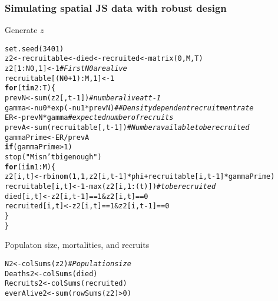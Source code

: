 \documentclass[color=usenames,dvipsnames]{beamer}\usepackage[]{graphicx}\usepackage[]{color}
\makeatletter
\newcommand{\hlnum}[1]{\textcolor[rgb]{0.69,0.494,0}{#1}}%
\newcommand{\hlstr}[1]{\textcolor[rgb]{0.749,0.012,0.012}{#1}}%
\newcommand{\hlcom}[1]{\textcolor[rgb]{0.514,0.506,0.514}{\textit{#1}}}%
\newcommand{\hlopt}[1]{\textcolor[rgb]{0,0,0}{#1}}%
\newcommand{\hlstd}[1]{\textcolor[rgb]{0,0,0}{#1}}%
\newcommand{\hlkwa}[1]{\textcolor[rgb]{0,0,0}{\textbf{#1}}}%
\newcommand{\hlkwb}[1]{\textcolor[rgb]{0,0.341,0.682}{#1}}%
\newcommand{\hlkwd}[1]{\textcolor[rgb]{0.004,0.004,0.506}{#1}}%
\newenvironment{kframe}{%
 \def\at@end@of@kframe{}%
 \ifinner\ifhmode%
  \def\at@end@of@kframe{\end{minipage}}%
  \begin{minipage}{\columnwidth}%
 \fi\fi%
 \def\FrameCommand##1{\hskip\@totalleftmargin \hskip-\fboxsep
 \colorbox{shadecolor}{##1}\hskip-\fboxsep
     \hskip-\linewidth \hskip-\@totalleftmargin \hskip\columnwidth}%
 \MakeFramed {\advance\hsize-\width
   \@totalleftmargin\z@ \linewidth\hsize
   \@setminipage}}%
 {\par\unskip\endMakeFramed%
 \at@end@of@kframe}
\newenvironment{knitrout}{}{} %
\makeatother
\begin{document}
\begin{frame}[fragile]
  \frametitle{Simulating spatial JS data with robust design}
{Generate $z$}
\scriptsize
\begin{knitrout}
\color{fgcolor}\begin{kframe}
\begin{alltt}
\hlkwd{set.seed}\hlstd{(}\hlnum{3401}\hlstd{)}
\hlstd{z2} \hlkwb{<-} \hlstd{recruitable} \hlkwb{<-} \hlstd{died} \hlkwb{<-} \hlstd{recruited} \hlkwb{<-} \hlkwd{matrix}\hlstd{(}\hlnum{0}\hlstd{, M, T)}
\hlstd{z2[}\hlnum{1}\hlopt{:}\hlstd{N0,}\hlnum{1}\hlstd{]} \hlkwb{<-} \hlnum{1} \hlcom{# First N0 are alive}
\hlstd{recruitable[(N0}\hlopt{+}\hlnum{1}\hlstd{)}\hlopt{:}\hlstd{M,}\hlnum{1}\hlstd{]} \hlkwb{<-} \hlnum{1}
\hlkwa{for}\hlstd{(t} \hlkwa{in} \hlnum{2}\hlopt{:}\hlstd{T) \{}
    \hlstd{prevN} \hlkwb{<-} \hlkwd{sum}\hlstd{(z2[,t}\hlopt{-}\hlnum{1}\hlstd{])} \hlcom{# number alive at t-1}
    \hlstd{gamma} \hlkwb{<-} \hlstd{nu0}\hlopt{*}\hlkwd{exp}\hlstd{(}\hlopt{-}\hlstd{nu1}\hlopt{*}\hlstd{prevN)} \hlcom{## Density dependent recruitment rate}
    \hlstd{ER} \hlkwb{<-} \hlstd{prevN}\hlopt{*}\hlstd{gamma} \hlcom{# expected number of recruits}
    \hlstd{prevA} \hlkwb{<-} \hlkwd{sum}\hlstd{(recruitable[,t}\hlopt{-}\hlnum{1}\hlstd{])} \hlcom{# Number available to be recruited}
    \hlstd{gammaPrime} \hlkwb{<-} \hlstd{ER}\hlopt{/}\hlstd{prevA}
    \hlkwa{if}\hlstd{(gammaPrime} \hlopt{>} \hlnum{1}\hlstd{)}
        \hlkwd{stop}\hlstd{(}\hlstr{"M isn't big enough"}\hlstd{)}
    \hlkwa{for}\hlstd{(i} \hlkwa{in} \hlnum{1}\hlopt{:}\hlstd{M) \{}
        \hlstd{z2[i,t]} \hlkwb{<-} \hlkwd{rbinom}\hlstd{(}\hlnum{1}\hlstd{,} \hlnum{1}\hlstd{, z2[i,t}\hlopt{-}\hlnum{1}\hlstd{]}\hlopt{*}\hlstd{phi} \hlopt{+} \hlstd{recruitable[i,t}\hlopt{-}\hlnum{1}\hlstd{]}\hlopt{*}\hlstd{gammaPrime)}
        \hlstd{recruitable[i,t]} \hlkwb{<-} \hlnum{1} \hlopt{-} \hlkwd{max}\hlstd{(z2[i,}\hlnum{1}\hlopt{:}\hlstd{(t)])} \hlcom{# to be recruited}
        \hlstd{died[i,t]} \hlkwb{<-} \hlstd{z2[i,t}\hlopt{-}\hlnum{1}\hlstd{]}\hlopt{==}\hlnum{1} \hlopt{&} \hlstd{z2[i,t]}\hlopt{==}\hlnum{0}
        \hlstd{recruited[i,t]} \hlkwb{<-} \hlstd{z2[i,t]}\hlopt{==}\hlnum{1} \hlopt{&} \hlstd{z2[i,t}\hlopt{-}\hlnum{1}\hlstd{]}\hlopt{==}\hlnum{0}
    \hlstd{\}}
\hlstd{\}}
\end{alltt}
\end{kframe}
\end{knitrout}
\pause
\vfill
{\normalsize Populaton size, mortalities, and recruits}
\begin{knitrout}
\color{fgcolor}\begin{kframe}
\begin{alltt}
\hlstd{N2} \hlkwb{<-} \hlkwd{colSums}\hlstd{(z2)} \hlcom{# Population size}
\hlstd{Deaths2} \hlkwb{<-} \hlkwd{colSums}\hlstd{(died)}
\hlstd{Recruits2} \hlkwb{<-} \hlkwd{colSums}\hlstd{(recruited)}
\hlstd{everAlive2} \hlkwb{<-} \hlkwd{sum}\hlstd{(}\hlkwd{rowSums}\hlstd{(z2)}\hlopt{>}\hlnum{0}\hlstd{)}
\end{alltt}
\end{kframe}
\end{knitrout}
\end{frame}
\end{document}
